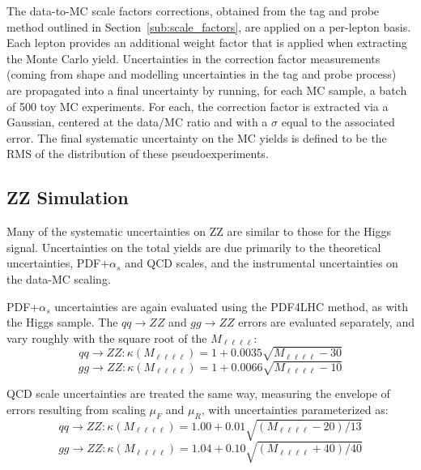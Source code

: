 The data-to-MC scale factors corrections, obtained from the tag and probe method
outlined in Section~\ref{sub:scale_factors}, are applied on a per-lepton basis.
Each lepton provides an additional weight factor that is applied when extracting
the Monte Carlo yield. Uncertainties in the correction factor measurements
(coming from shape and modelling uncertainties in the tag and probe process) are
propagated into a final uncertainty by running, for each MC sample, a batch of
500 toy MC experiments. For each, the correction factor is extracted via a
Gaussian, centered at the data/MC ratio and with a $\sigma$ equal to the
associated error. The final systematic uncertainty on the MC yields is defined
to be the RMS of the distribution of these pseudoexperiments.


\subsection{ZZ Simulation}
Many of the systematic uncertainties on ZZ are similar to those for the Higgs signal.
Uncertainties on the total yields are due primarily to the theoretical
uncertainties, PDF+$\alpha_s$ and QCD scales, and the instrumental uncertainties
on the data-MC scaling.

PDF+$\alpha_s$ uncertainties are again evaluated using the PDF4LHC method, as
with the Higgs sample. The $qq \rightarrow ZZ$ and $gg\rightarrow ZZ$
errors are evaluated separately, and vary roughly with the square root of the
$M_{\ell\ell\ell\ell}$:
\begin{equation*}
    qq\rightarrow ZZ : \kappa (M_{\ell\ell\ell\ell}) = 1 + 0.0035
    \sqrt{M_{\ell\ell\ell\ell} - 30}
\end{equation*}
\begin{equation}
    gg\rightarrow ZZ : \kappa (M_{\ell\ell\ell\ell}) = 1 + 0.0066
    \sqrt{M_{\ell\ell\ell\ell} - 10}
\end{equation}

QCD scale uncertainties are treated the same way, measuring the envelope of errors
resulting from scaling $\mu_F$ and $\mu_R$, with uncertainties
parameterized as:
\begin{equation*}
    qq\rightarrow ZZ : \kappa (M_{\ell\ell\ell\ell}) = 1.00 + 0.01\sqrt{(M_{\ell
    \ell\ell\ell} -20)/13}
\end{equation*}
\begin{equation*}
    gg\rightarrow ZZ : \kappa (M_{\ell\ell\ell\ell}) = 1.04 + 0.10\sqrt{(M_{\ell
    \ell\ell\ell} +40)/40}
\end{equation*}

